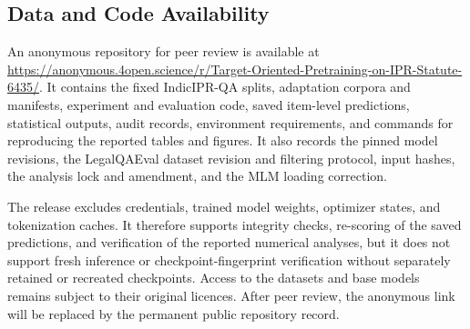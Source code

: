 \documentclass[pdflatex,sn-basic]{sn-jnl}
\begin{document}
\FloatBarrier
\begin{samepage}
\section*{Data and Code Availability}

An anonymous repository for peer review is available at
\url{https://anonymous.4open.science/r/Target-Oriented-Pretraining-on-IPR-Statute-6435/}.
It contains the fixed IndicIPR-QA splits, adaptation corpora and manifests,
experiment and evaluation code, saved item-level predictions, statistical
outputs, audit records, environment requirements, and commands for reproducing
the reported tables and figures. It also records the pinned model revisions,
the LegalQAEval dataset revision and filtering protocol, input hashes, the
analysis lock and amendment, and the MLM loading correction.

The release excludes credentials, trained model weights, optimizer states, and
tokenization caches. It therefore supports integrity checks, re-scoring of the
saved predictions, and verification of the reported numerical analyses, but it
does not support fresh inference or checkpoint-fingerprint verification without
separately retained or recreated checkpoints. Access to the datasets and base
models remains subject to their original licences. After peer review, the
anonymous link will be replaced by the permanent public repository record.
\end{samepage}


\end{document}
